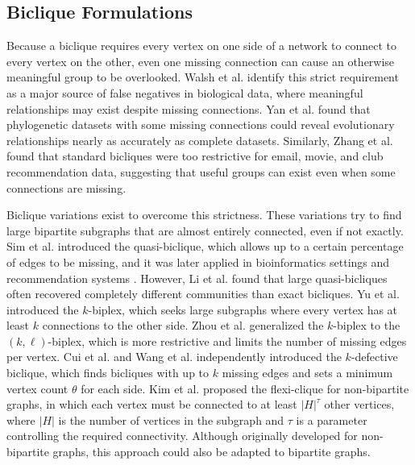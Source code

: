 \documentclass[conference]{IEEEtran}
\begin{document}
\subsection{Biclique Formulations}

Because a biclique requires every vertex on one side of a network to connect to every vertex on the other, even one missing connection can cause an otherwise meaningful group to be overlooked. Walsh et al. \cite{walsh2016discovering} identify this strict requirement as a major source of false negatives in biological data, where meaningful relationships may exist despite missing connections. Yan et al. \cite{yan2005identifying} found that phylogenetic datasets with some missing connections could reveal evolutionary relationships nearly as accurately as complete datasets. Similarly, Zhang et al. \cite{zhang2025density} found that standard bicliques were too restrictive for email, movie, and club recommendation data, suggesting that useful groups can exist even when some connections are missing.

Biclique variations exist to overcome this strictness. These variations try to find large bipartite subgraphs that are almost entirely connected, even if not exactly. Sim et al. \cite{sim2009mining} introduced the quasi-biclique, which allows up to a certain percentage of edges to be missing, and it was later applied in bioinformatics settings and recommendation systems \cite{sim2009mining, li2008quasi, maulik2012mining, zhang2025density}. However, Li et al. \cite{li2008quasi} found that large quasi-bicliques often recovered completely different communities than exact bicliques. Yu et al. \cite{yu2021} introduced the $k$-biplex, which seeks large subgraphs where every vertex has at least $k$ connections to the other side. Zhou et al. \cite{zhou2025} generalized the $k$-biplex to the $(k, \ell)$-biplex, which is more restrictive and limits the number of missing edges per vertex. Cui et al. \cite{cui2025efficient} and Wang et al. \cite{wang2025defective} independently introduced the $k$-defective biclique, which finds bicliques with up to $k$ missing edges and sets a minimum vertex count $\theta$ for each side. Kim et al. \cite{kim2026} proposed the flexi-clique for non-bipartite graphs, in which each vertex must be connected to at least $|H|^\tau$ other vertices, where $|H|$ is the number of vertices in the subgraph and $\tau$ is a parameter controlling the required connectivity. Although originally developed for non-bipartite graphs, this approach could also be adapted to bipartite graphs.
\end{document}
